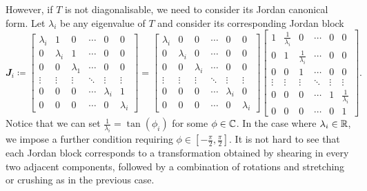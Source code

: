 \documentclass[math, code]{amznotes}
\theoremstyle{remark}
\begin{document}
However, if $T$ is not diagonalisable, we need to consider its Jordan canonical form. Let $\lambda_i$ be any eigenvalue of $T$ and consider its corresponding Jordan block
\begin{equation*}
    \mathbfit{J}_i \coloneqq \begin{bmatrix}
        \lambda_i & 1 & 0 & \cdots & 0 & 0 \\
        0 & \lambda_i & 1 & \cdots & 0 & 0 \\
        0 & 0 & \lambda_1 & \cdots & 0 & 0 \\
        \vdots & \vdots & \vdots & \ddots & \vdots & \vdots \\
        0 & 0 & 0 & \cdots & \lambda_i & 1 \\
        0 & 0 & 0 & \cdots & 0 & \lambda_i
    \end{bmatrix} = \begin{bmatrix}
        \lambda_i & 0 & 0 & \cdots & 0 & 0 \\
        0 & \lambda_i & 0 & \cdots & 0 & 0 \\
        0 & 0 & \lambda_i & \cdots & 0 & 0 \\
        \vdots & \vdots & \vdots & \ddots & \vdots & \vdots \\
        0 & 0 & 0 & \cdots & \lambda_i & 0 \\
        0 & 0 & 0 & \cdots & 0 & \lambda_i
    \end{bmatrix}\begin{bmatrix}
        1 & \frac{1}{\lambda_i} & 0 & \cdots & 0 & 0 \\
        0 & 1 & \frac{1}{\lambda_i} & \cdots & 0 & 0 \\
        0 & 0 & 1 & \cdots & 0 & 0 \\
        \vdots & \vdots & \vdots & \ddots & \vdots & \vdots \\
        0 & 0 & 0 & \cdots & 1 & \frac{1}{\lambda_i} \\
        0 & 0 & 0 & \cdots & 0 & 1
    \end{bmatrix}.
\end{equation*}
Notice that we can set $\frac{1}{\lambda_i} = \tan(\phi_i)$ for some $\phi \in \mathbb{C}$. In the case where $\lambda_i \in \mathbb{R}$, we impose a further condition requiring $\phi \in [-\frac{\pi}{2}, \frac{\pi}{2}]$. It is not hard to see that each Jordan block corresponds to a transformation obtained by shearing in every two adjacent components, followed by a combination of rotations and stretching or crushing as in the previous case.
\end{document}
